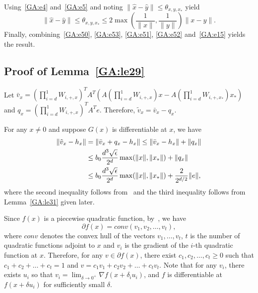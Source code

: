Using~\eqref{GA:e4} and~\eqref{GA:e5} and noting $\|\hat{x} - \hat{y}\| \leq \theta_{x, y, x_*}$ yield
\begin{equation} \label{GA:e15}
\|\hat{x} - \hat{y}\| \leq \theta_{x, y, x_*} \leq 2 \max\left( \frac{1}{\|x\|}, \frac{1}{\|y\|} \right) \|x - y\|.
\end{equation}
Finally, combining~\eqref{GA:e50}, \eqref{GA:e53}, \eqref{GA:e51}, \eqref{GA:e52} and~\eqref{GA:e15} yields the result.

\subsection{Proof of Lemma~\ref{GA:le29}}

Let $\bar{v}_x = \left(\prod_{i = d}^1 W_{i, +, x}\right)^T A^T (A \left(\prod_{i = d}^1 W_{i, +, x}\right) x - A \left(\prod_{i = d}^1 W_{i, +, x_*}\right) x_*) $ and $q_x = \left(\prod_{i = d}^1 W_{i, +, x}\right)^T A^T e$. Therefore, $\tilde{v}_x = \bar{v}_x - q_x$.

For any $x \neq 0$ and suppose $G(x)$ is differentiable at $x$, we have
\begin{align}
\|\tilde{v}_x - h_x\|
&=
\|\bar{v}_x + q_x- h_x\| \leq
\|\bar{v}_x-h_x\| + \|q_x\| \nonumber \\
&\leq
b_0 \frac{d^3 \sqrt{\epsilon}}{2^d} \max ( \|x\|, \| x_* \|)
+
\|q_x\| \nonumber \\
&\leq
b_0 \frac{d^3 \sqrt{\epsilon}}{2^d} \max ( \|x\|, \| x_* \|)
+
\frac{2}{2^{d/2}} \|e\|, \label{GA:e70}
\end{align}
where the second inequality follows from~\cite[(29)]{HV17} and the third inequality follows from Lemma~\ref{GA:le31} given later.

Since $f(x)$ is a piecewise quadratic function, by~\cite[Theorem~9.6]{Clason2017}, we have
\begin{equation*}
\partial f(x) = conv(v_1, v_2, \ldots, v_t),
\end{equation*}
where $conv$ denotes the convex hull of the vectors $v_1, \ldots, v_t$, $t$ is the number of quadratic functions adjoint to $x$ and $v_i$ is the gradient of the $i$-th quadratic function at $x$. Therefore, for any $v \in \partial f(x)$, there exist $c_1, c_2, \ldots, c_t \geq 0$ such that $c_1 + c_2 + \ldots + c_t = 1$ and $v = c_1 v_1 + c_2 v_2 + \ldots + c_t v_t$. Note that for any $v_i$, there exists $u_i$ so that $v_i = \lim_{\delta \rightarrow 0^+} \nabla f(x + \delta_i u_i)$, and $f$ is differentiable at $f(x + \delta u_i)$ for sufficiently small $\delta$.

